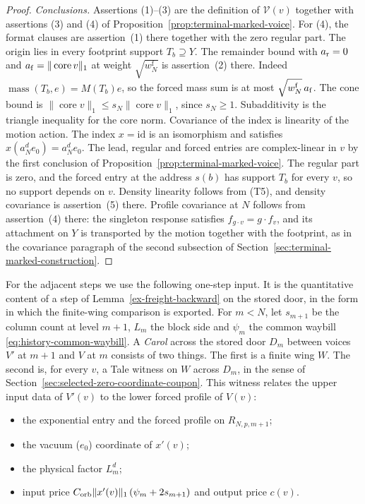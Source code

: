 \begin{proof}
\emph{Conclusions.} Assertions (1)--(3) are the definition of
$\mathcal V(v)$ together with assertions (3) and (4) of
Proposition~\ref{prop:terminal-marked-voice}. For (4), the format
clauses are assertion~(1) there together with the zero regular part.
The origin lies in every footprint support $T_b\supseteq Y$. The
remainder bound with $a_{\rm r}=0$ and $a_{\rm f}=\|\operatorname{core}v\|_1$
at weight $\sqrt{w^{\mathrm f}_N}$ is assertion~(2) there. Indeed
$\operatorname{mass}(T_b,e)=M(T_b)e$, so the forced mass sum is at most
$\sqrt{w^{\mathrm f}_N}\,a_{\rm f}$. The cone bound is
$\|\operatorname{core}v\|_1\le s_N\|\operatorname{core}v\|_1$, since
$s_N\ge1$. Subadditivity is the triangle inequality for the core norm.
Covariance of the index is linearity of the motion action. The index
$x=\mathrm{id}$ is an isomorphism and satisfies
$x(a_N^de_0)=a_N^de_0$. The lead, regular and forced entries are
complex-linear in $v$ by the first conclusion of
Proposition~\ref{prop:terminal-marked-voice}. The regular part is zero,
and the forced entry at the address $s(b)$ has support $T_b$ for every
$v$, so no support depends on $v$. Density linearity follows from (T5),
and density covariance is assertion~(5) there. Profile covariance at $N$
follows from assertion~(4) there: the singleton response satisfies
$f_{g\cdot v}=g\cdot f_v$, and its attachment on $Y$ is transported by
the motion together with the footprint, as in the covariance paragraph
of the second subsection of Section~\ref{sec:terminal-marked-construction}.
\end{proof}

For the adjacent steps we use the following one-step input. It is the
quantitative content of a step of Lemma~\ref{ex-freight-backward} on the
stored door, in the form in which the finite-wing comparison is exported.
For $m<N$, let $s_{m+1}$ be the column count at level $m+1$, $L_m$ the
block side and $\psi_m$ the common waybill
\eqref{eq:history-common-waybill}. A \emph{Carol} across the stored door
$D_m$ between voices $V'$ at $m+1$ and $V$ at $m$ consists of two
things. The first is a finite wing $W$. The second is, for every $v$, a
Tale witness on $W$ across $D_m$, in the sense of
Section~\ref{sec:selected-zero-coordinate-coupon}. This witness relates
the upper input data of $V'(v)$ to the lower forced profile of $V(v)$:
\begin{itemize}
\item the exponential entry and the forced profile on $R_{N,p,m+1}$;
\item the vacuum ($e_0$) coordinate of $x'(v)$;
\item the physical factor $L_m^d$;
\item input price
  $C_{\rm orb}\|x'(v)\|_1\,(\psi_m+2s_{m+1})$ and output price $c(v)$.
\end{itemize}

